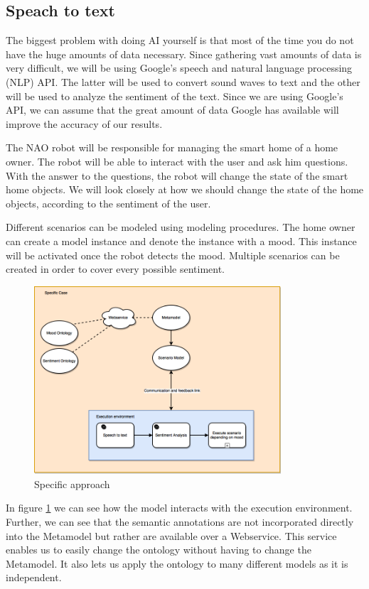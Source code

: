 \documentclass{lncs}
\begin{document}
\subsection{Speach to text}

The biggest problem with doing AI yourself is that most of the time you do not have the huge amounts of data necessary. Since gathering vast amounts of data is very difficult, we will be using Google's speech and natural language processing (NLP) API. The latter will be used to convert sound waves to text and the other will be used to analyze the sentiment of the text. Since we are using Google's API, we can assume that the great amount of data Google has available will improve the accuracy of our results.

The NAO robot will be responsible for managing the smart home of a home owner. The robot will be able to interact with the user and ask him questions. With the answer to the questions, the robot will change the state of the smart home objects. We will look closely at how we should change the state of the home objects, according to the sentiment of the user.

Different scenarios can be modeled using modeling procedures. The home owner can create a model instance and denote the instance with a mood. This instance will be activated once the robot detects the mood. Multiple scenarios can be created in order to cover every possible sentiment.

\begin{figure}%
\includegraphics[width=\linewidth, height=7cm]{validationOmiRob.png}
\caption{Specific approach}
\label{fig:validation}
\end{figure}

In figure \ref{fig:validation} we can see how the model interacts with the execution environment. Further, we can see that the semantic annotations are not incorporated directly into the Metamodel but rather are available over a Webservice. This service enables us to easily change the ontology without having to change the Metamodel. It also lets us apply the ontology to many different models as it is independent.
\end{document}
